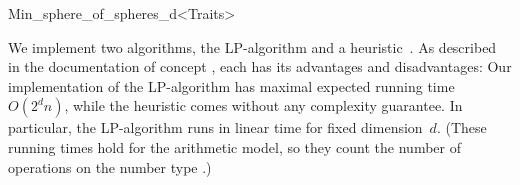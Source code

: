 \begin{ccRefClass}{Min_sphere_of_spheres_d<Traits>}
\begin{ccIndexMemberFunctions}
 \end{ccIndexMemberFunctions}

%
%
%
%

%

\ccImplementation
\ccIndexImplementation
{}

We implement two algorithms, the LP-algorithm and a
heuristic~\cite{msw-sblp-92}.  As described in the documentation of
concept , each has its advantages and
disadvantages: Our implementation of the LP-algorithm has maximal
expected running time $O(2^d n)$, while the heuristic comes without
any complexity guarantee.  In particular, the LP-algorithm runs in
linear time for fixed dimension~$d$. (These running times hold for the
arithmetic model, so they count the number of operations on
the number type .)


\end{ccRefClass}
